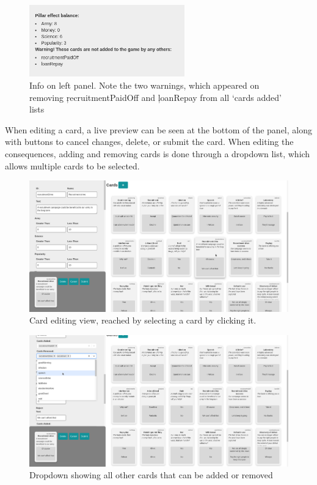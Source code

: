 \begin{figure}[!h]
	\centering
	\includegraphics[width=0.6\textwidth]{./images/design/info.png}
	\caption{Info on left panel. Note the two warnings, which appeared on removing \c{recruitmentPaidOff} and \c{loanRepay} from all `cards added' lists}
	\label{fig:info}
\end{figure}

When editing a card, a live preview can be seen at the bottom of the panel, along with buttons to cancel changes, delete, or submit the card. When editing the consequences, adding and removing cards is done through a dropdown list, which allows multiple cards to be selected.

\begin{figure}[!h]
	\centering
	\includegraphics[width=1.0\textwidth]{./images/design/card_edit.png}
	\caption{Card editing view, reached by selecting a card by clicking it.}
	\label{fig:card_edit}
\end{figure}

\begin{figure}[!h]
	\centering
	\includegraphics[width=1.0\textwidth]{./images/design/add_card.png}
	\caption{Dropdown showing all other cards that can be added or removed}
	\label{fig:add_card}
\end{figure}

